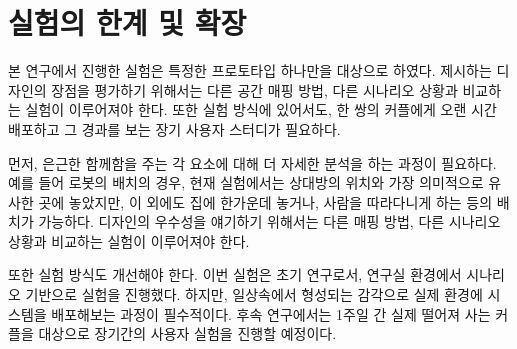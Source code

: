 



\section{실험의 한계 및 확장}

본 연구에서 진행한 실험은 특정한 프로토타입 하나만을 대상으로 하였다. 제시하는 디자인의 장점을 평가하기 위해서는 다른 공간 매핑 방법, 다른 시나리오 상황과 비교하는 실험이 이루어져야 한다. 또한 실험 방식에 있어서도, 한 쌍의 커플에게 오랜 시간 배포하고 그 경과를 보는 장기 사용자 스터디가 필요하다.

먼저, 은근한 함께함을 주는 각 요소에 대해 더 자세한 분석을 하는 과정이 필요하다. 예를 들어 로봇의 배치의 경우, 현재 실험에서는 상대방의 위치와 가장 의미적으로 유사한 곳에 놓았지만, 이 외에도 집에 한가운데 놓거나, 사람을 따라다니게 하는 등의 배치가 가능하다. 디자인의 우수성을 얘기하기 위해서는 다른 매핑 방법, 다른 시나리오 상황과 비교하는 실험이 이루어져야 한다.

또한 실험 방식도 개선해야 한다. 이번 실험은 초기 연구로서, 연구실 환경에서 시나리오 기반으로 실험을 진행했다. 하지만, \concept\는 일상속에서 형성되는 감각으로 실제 환경에 시스템을 배포해보는 과정이 필수적이다. 후속 연구에서는 1주일 간 실제 떨어져 사는 커플을 대상으로 장기간의 사용자 실험을 진행할 예정이다.


